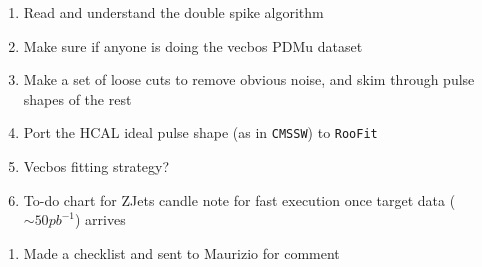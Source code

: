 

\begin{enumerate}
\item Read and understand the double spike algorithm
\item Make sure if anyone is doing the vecbos PDMu dataset
\item Make a set of loose cuts to remove obvious noise, and skim through pulse shapes of the rest
\item Port the HCAL ideal pulse shape (as in \texttt{CMSSW}) to \texttt{RooFit}
\item Vecbos fitting strategy?
\item To-do chart for ZJets candle note for fast execution once target data ($\sim 50 pb^{-1}$) arrives
\end{enumerate}


\begin{enumerate}
\item Made a checklist and sent to Maurizio for comment
\end{enumerate}


